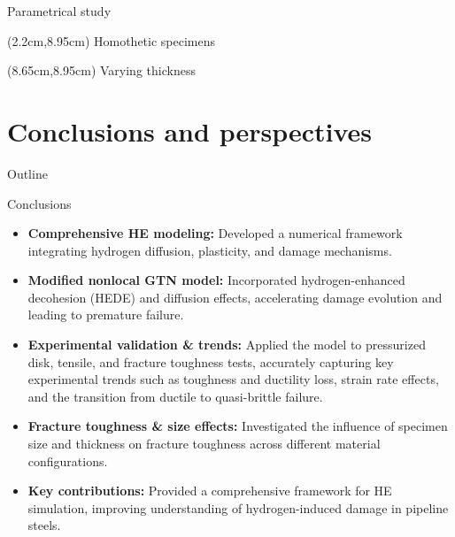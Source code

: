 \documentclass[9pt]{beamer}
\begin{document}
\begin{frame}{Parametrical study}
    \begin{textblock*}{5cm}(2.2cm,8.95cm)
        \small Homothetic specimens
    \end{textblock*}

    \begin{textblock*}{5cm}(8.65cm,8.95cm)
        \small Varying thickness
    \end{textblock*}
    
\end{frame}


\section{Conclusions and perspectives}

\begin{frame}{Outline}
	\tableofcontents[ 
    currentsubsection, 
    hideothersubsections, 
    sectionstyle=show/shaded, 
    subsectionstyle=show/shaded, 
    ] 
\end{frame}


\begin{frame}{Conclusions}

\begin{itemize}

	\item \textbf{Comprehensive HE modeling:} Developed a numerical framework integrating hydrogen diffusion, plasticity, and damage mechanisms.
	\vspace{0.15cm}
	\item \textbf{Modified nonlocal GTN model:} Incorporated hydrogen-enhanced decohesion (HEDE) and diffusion effects, accelerating damage evolution and leading to premature failure.
	\vspace{0.15cm}
	\item \textbf{Experimental validation \& trends:} Applied the model to pressurized disk, tensile, and fracture toughness tests, accurately capturing key experimental trends such as toughness and ductility loss, strain rate effects, and the transition from ductile to quasi-brittle failure.
	\vspace{0.15cm}
	\item \textbf{Fracture toughness \& size effects:} Investigated the influence of specimen size and thickness on fracture toughness across different material configurations.
	\vspace{0.15cm}
	\item \textbf{\textcolor{MINESBlue}{Key contributions:}} Provided a comprehensive framework for HE simulation, improving understanding of hydrogen-induced damage in pipeline steels.
	
\end{itemize}

\end{frame}
\end{document}
